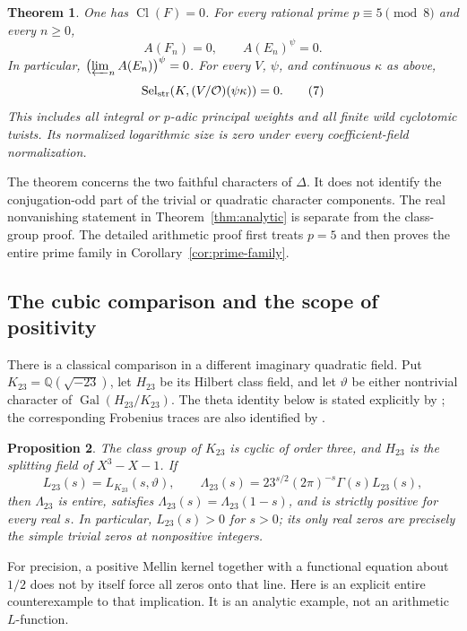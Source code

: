 \documentclass[11pt]{article}
\newtheorem{theorem}{Theorem}[section]
\newtheorem{proposition}[theorem]{Proposition}
\newcommand{\Q}{\mathbb Q}
\newcommand{\Cl}{\operatorname{Cl}}
\newcommand{\Gal}{\operatorname{Gal}}
\newcommand{\Sel}{\operatorname{Sel}}
\begin{document}
\begin{theorem}\label{thm:arithmetic}
One has $\Cl(F)=0$. For every rational prime $p\equiv5\pmod8$ and
every $n\ge0$,
\[
 A(F_n)=0,\qquad A(E_n)^\psi=0.
 \tag{6}\label{eq:class-zero}
\]
In particular, $\bigl(\varprojlim_n A(E_n)\bigr)^\psi=0$.
For every $V$, $\psi$, and continuous $\kappa$ as above,
\[
 \Sel_{\rm str}(K,(V/\mathcal O)(\psi\kappa))=0.
 \tag{7}\label{eq:selmer-zero}
\]
This includes all integral or $p$-adic principal weights and all finite
wild cyclotomic twists. Its normalized logarithmic size is zero under
every coefficient-field normalization.
\end{theorem}

The theorem concerns the two faithful characters of $\Delta$.
It does not identify the conjugation-odd part of the trivial or quadratic
character components. The real nonvanishing statement in
Theorem~\ref{thm:analytic} is separate from the class-group proof.
The detailed arithmetic proof first treats $p=5$ and then proves the
entire prime family in Corollary~\ref{cor:prime-family}.

\subsection{The cubic comparison and the scope of positivity}

There is a classical comparison in a different imaginary quadratic
field. Put $K_{23}=\Q(\sqrt{-23})$, let $H_{23}$ be its Hilbert class
field, and let $\vartheta$ be either nontrivial character of
$\Gal(H_{23}/K_{23})$. The theta identity below is stated explicitly
by \citet[p.~5 of the author version]{DukeLi2015}; the corresponding
Frobenius traces are also identified by
\citet[Theorem~3.1, p.~14]{deShalit2012}.

\begin{proposition}\label{prop:23}
The class group of $K_{23}$ is cyclic of order three, and $H_{23}$ is
the splitting field of $X^3-X-1$. If
\[
 L_{23}(s)=L_{K_{23}}(s,\vartheta),\qquad
 \Lambda_{23}(s)=23^{s/2}(2\pi)^{-s}\Gamma(s)L_{23}(s),
 \tag{32}\label{eq:23-completion}
\]
then $\Lambda_{23}$ is entire, satisfies
$\Lambda_{23}(s)=\Lambda_{23}(1-s)$, and is strictly positive for
every real $s$. In particular, $L_{23}(s)>0$ for $s>0$; its only
real zeros are precisely the simple trivial zeros at nonpositive integers.
\end{proposition}



For precision, a positive Mellin kernel together with a functional
equation about $1/2$ does not by itself force all zeros onto that line.
Here is an explicit entire counterexample to that implication. It is
an analytic example, not an arithmetic $L$-function.
\end{document}
